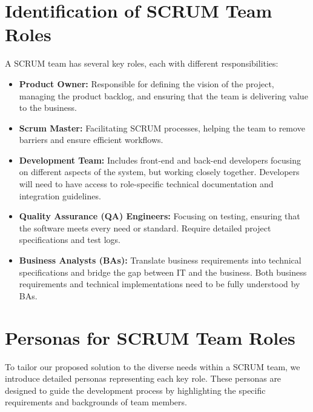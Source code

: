 
\section{Identification of SCRUM Team Roles}

A SCRUM team has several key roles, each with different responsibilities:


\begin{itemize}
    \item \textbf{Product Owner:} Responsible for defining the vision of the project, managing the product backlog, and ensuring that the team is delivering value to the business.
    \item \textbf{Scrum Master:} Facilitating SCRUM processes, helping the team to remove barriers and ensure efficient workflows.
    \item \textbf{Development Team:} Includes front-end and back-end developers focusing on different aspects of the system, but working closely together. Developers will need to have access to role-specific technical documentation and integration guidelines.
    \item \textbf{Quality Assurance (QA) Engineers:} Focusing on testing, ensuring that the software meets every need or standard. Require detailed project specifications and test logs.
    \item \textbf{Business Analysts (BAs):} Translate business requirements into technical specifications and bridge the gap between IT and the business. Both business requirements and technical implementations need to be fully understood by BAs.
\end{itemize}


\section{Personas for SCRUM Team Roles}

To tailor our proposed solution to the diverse needs within a SCRUM team, we introduce detailed personas representing each key role. These personas are designed to guide the development process by highlighting the specific requirements and backgrounds of team members.

